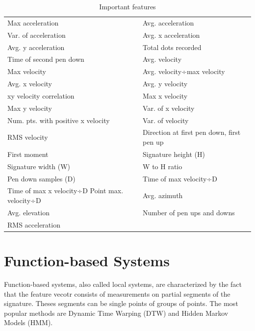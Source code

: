 \documentclass[a4paper, oneside]{csthesis}
\begin{document}
\begin{table}[tb]
    \caption{Important features}
    \label{fig:figurename}
    \begin{center}
        \begin{tabular}{p{6cm}|p{6cm}}
Max acceleration & Avg. acceleration \\ \hdashline[0.5pt/3pt]
Var. of acceleration & Avg. x acceleration \\ \hdashline[0.5pt/3pt]
Avg. y acceleration & Total dots recorded \\ \hdashline[0.5pt/3pt]
Time of second pen down & Avg. velocity \\ \hdashline[0.5pt/3pt]
Max velocity & Avg. velocity÷max velocity \\ \hdashline[0.5pt/3pt]
Avg. x velocity & Avg. y velocity \\ \hdashline[0.5pt/3pt]
xy velocity correlation & Max x velocity \\ \hdashline[0.5pt/3pt]
Max y velocity & Var. of x velocity \\ \hdashline[0.5pt/3pt]
Num. pts. with positive x velocity & Var. of velocity \\ \hdashline[0.5pt/3pt]
RMS velocity & Direction at first pen down, first pen up \\ \hdashline[0.5pt/3pt]
First moment & Signature height (H) \\ \hdashline[0.5pt/3pt]
Signature width (W) & W to H ratio \\ \hdashline[0.5pt/3pt]
Pen down samples (D) & Time of max velocity÷D \\ \hdashline[0.5pt/3pt]
Time of max x velocity÷D Point max. velocity÷D & Avg. azimuth \\ \hdashline[0.5pt/3pt]
Avg. elevation & Number of pen ups and downs  \\ \hdashline[0.5pt/3pt]
RMS acceleration & \\ \hline

        \hline
        \end{tabular}
    \end{center}
\end{table}



\section{Function-based Systems}

Function-based systems, also called local systems, are characterized by the fact that the feature vecotr consists of measurements on partial segments of the signature. Theses segments can be single points of groups of points. The most popular methods are Dynamic Time Warping (DTW) and Hidden Markov Models (HMM).
\end{document}
